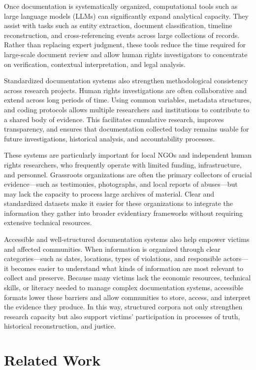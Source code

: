 \documentclass{article}
\begin{document}
Once documentation is systematically organized, computational tools such as large language models (LLMs) can significantly expand analytical capacity. They assist with tasks such as entity extraction, document classification, timeline reconstruction, and cross-referencing events across large collections of records. Rather than replacing expert judgment, these tools reduce the time required for large-scale document review and allow human rights investigators to concentrate on verification, contextual interpretation, and legal analysis.

Standardized documentation systems also strengthen methodological consistency across research projects. Human rights investigations are often collaborative and extend across long periods of time. Using common variables, metadata structures, and coding protocols allows multiple researchers and institutions to contribute to a shared body of evidence. This facilitates cumulative research, improves transparency, and ensures that documentation collected today remains usable for future investigations, historical analysis, and accountability processes.

These systems are particularly important for local NGOs and independent human rights researchers, who frequently operate with limited funding, infrastructure, and personnel. Grassroots organizations are often the primary collectors of crucial evidence—such as testimonies, photographs, and local reports of abuses—but may lack the capacity to process large archives of material. Clear and standardized datasets make it easier for these organizations to integrate the information they gather into broader evidentiary frameworks without requiring extensive technical resources.

Accessible and well-structured documentation systems also help empower victims and affected communities. When information is organized through clear categories—such as dates, locations, types of violations, and responsible actors—it becomes easier to understand what kinds of information are most relevant to collect and preserve. Because many victims lack the economic resources, technical skills, or literacy needed to manage complex documentation systems, accessible formats lower these barriers and allow communities to store, access, and interpret the evidence they produce. In this way, structured corpora not only strengthen research capacity but also support victims’ participation in processes of truth, historical reconstruction, and justice.


\section{Related Work}\label{related-work}
\end{document}
